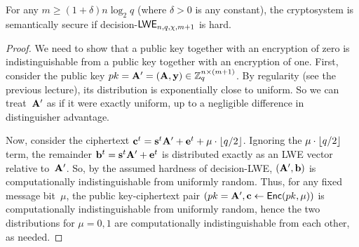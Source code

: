\documentclass[11pt]{article}
\begin{document}
\begin{lemma}
  \label{lem:security}
  For any $m \geq (1+\delta) n \log_{2} q$ (where $\delta > 0$ is any
  constant), the cryptosystem is semantically secure if
  decision-$\mathsf{LWE}_{n,q,\chi,m+1}$ is hard.
\end{lemma}

\begin{proof}
  We need to show that a public key together with an encryption of
  zero is indistinguishable from a public key together with an
  encryption of one. First, consider the public key
  $pk = \mathbf{A}' = (\mathbf{A}, \mathbf{y}) \in \mathbb{Z}_q^{n \times (m+1)}$. By
  regularity (see the previous lecture), its distribution is
  exponentially close to uniform. So we can treat~$\mathbf{A}'$ as if it
  were exactly uniform, up to a negligible difference in distinguisher
  advantage.

  Now, consider the ciphertext
  $\mathbf{c}^{t} = \mathbf{s}^t\mathbf{A}' + \mathbf{e}^t + \mu \cdot \lfloor q/2\rfloor$.
  Ignoring the $\mu \cdot \lfloor q/2\rfloor$ term, the remainder
  $\mathbf{b}^{t} = \mathbf{s}^t\mathbf{A}' + \mathbf{e}^t$ is distributed exactly as an
  LWE vector relative to~$\mathbf{A}'$. So, by the assumed hardness of
  decision-LWE, $(\mathbf{A}', \mathbf{b})$ is computationally indistinguishable
  from uniformly random. Thus, for any fixed message bit~$\mu$, the
  public key-ciphertext pair
  $(pk = \mathbf{A}', \mathbf{c} \gets \mathsf{Enc}(pk,\mu))$ is computationally
  indistinguishable from uniformly random, hence the two distributions
  for $\mu=0,1$ are computationally indistinguishable from each other,
  as needed.
\end{proof}



\end{document}

